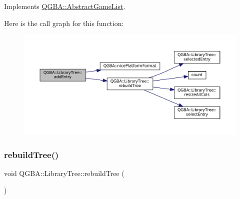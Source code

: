 Implements \mbox{\hyperlink{class_q_g_b_a_1_1_abstract_game_list_a4eb177df105d205ebc19a017343874ce}{Q\+G\+B\+A\+::\+Abstract\+Game\+List}}.

Here is the call graph for this function\+:
\nopagebreak
\begin{figure}[H]
\begin{center}
\leavevmode
\includegraphics[width=350pt]{class_q_g_b_a_1_1_library_tree_a36da639f0d8de0811da90f337ee403bd_cgraph}
\end{center}
\end{figure}
\mbox{\label{class_q_g_b_a_1_1_library_tree_a883554c1ef63b3de33d2f609eb743893}} 
\subsubsection{\texorpdfstring{rebuild\+Tree()}{rebuildTree()}}
{\footnotesize\ttfamily void Q\+G\+B\+A\+::\+Library\+Tree\+::rebuild\+Tree (\begin{DoxyParamCaption}{ }\end{DoxyParamCaption})\hspace{0.3cm}{\ttfamily [private]}}

